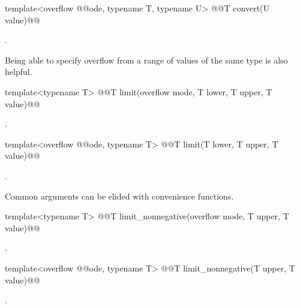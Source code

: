 \begin{addedblock}
\begin{itemdecl}
template<overflow @@ode, typename T, typename U> @@T convert(U value)@\addmodif{;}@
\end{itemdecl}

\begin{itemdescr}
\returns {}.	
\end{itemdescr}

Being able to specify overflow from a range of values of the same type is also helpful.

\begin{itemdecl}
template<typename T> @@T limit(overflow mode, T lower, T upper, T value)@\addmodif{;}@
\end{itemdecl}

\begin{itemdescr}
\returns {}.
\end{itemdescr}

\begin{itemdecl}
template<overflow @@ode, typename T> @@T limit(T lower, T upper, T value)@\addmodif{;}@
\end{itemdecl}

\begin{itemdescr}
\returns {}.
\end{itemdescr}

Common arguments can be elided with convenience functions.

\begin{itemdecl}
template<typename T> @@T limit_nonnegative(overflow mode, T upper, T value)@\addmodif{;}@
\end{itemdecl}

\begin{itemdescr}
\returns {}.
\end{itemdescr}

\begin{itemdecl}
template<overflow @@ode, typename T> @@T limit_nonnegative(T upper, T value)@\addmodif{;}@
\end{itemdecl}

\begin{itemdescr}
\returns {}.
\end{itemdescr}


\end{addedblock}
